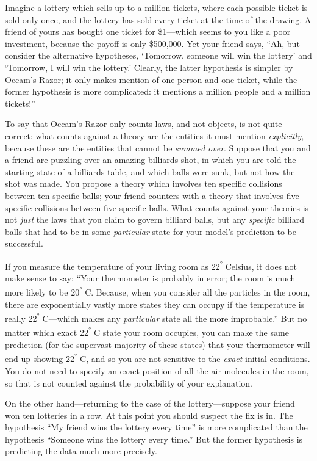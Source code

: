 {
 Imagine a lottery which sells up to a million tickets, where each
possible ticket is sold only once, and the lottery has sold every
ticket at the time of the drawing. A friend of yours has bought one
ticket for \$1---which seems to you like a poor investment, because the
payoff is only \$500,000. Yet your friend says, ``Ah,
but consider the alternative hypotheses, `Tomorrow,
someone will win the lottery' and
`Tomorrow, I will win the lottery.'
Clearly, the latter hypothesis is simpler by Occam's
Razor; it only makes mention of one person and one ticket, while the
former hypothesis is more complicated: it mentions a million people and
a million tickets!''}

{
 To say that Occam's Razor only counts laws, and
not objects, is not quite correct: what counts against a theory are the
entities it must mention \textit{explicitly}, because these are the
entities that cannot be \textit{summed over}. Suppose that you and a
friend are puzzling over an amazing billiards shot, in which you are
told the starting state of a billiards table, and which balls were
sunk, but not how the shot was made. You propose a theory which
involves ten specific collisions between ten specific balls; your
friend counters with a theory that involves five specific collisions
between five specific balls. What counts against your theories is not
\textit{just} the laws that you claim to govern billiard balls, but any
\textit{specific} billiard balls that had to be in some
\textit{particular} state for your model's prediction
to be successful.}

{
 If you measure the temperature of your living room as
22\textsuperscript{°} Celsius, it does not make sense to say:
``Your thermometer is probably in error; the room is
much more likely to be 20\textsuperscript{°} C. Because, when you
consider all the particles in the room, there are exponentially vastly
more states they can occupy if the temperature is really
22\textsuperscript{°} C---which makes any \textit{particular} state all
the more improbable.'' But no matter which exact
22\textsuperscript{°} C state your room occupies, you can make the same
prediction (for the supervast majority of these states) that your
thermometer will end up showing 22\textsuperscript{°} C, and so you are
not sensitive to the \textit{exact} initial conditions. You do not need
to specify an exact position of all the air molecules in the room, so
that is not counted against the probability of your explanation.}

{
 On the other hand---returning to the case of the lottery---suppose
your friend won ten lotteries in a row. At this point you should
suspect the fix is in. The hypothesis ``My friend wins
the lottery every time'' is more complicated than the
hypothesis ``Someone wins the lottery every
time.'' But the former hypothesis is predicting the
data much more precisely.}

